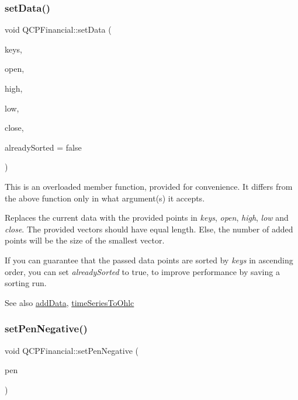 \subsubsection{\texorpdfstring{setData()}{setData()}\hspace{0.1cm}{\footnotesize\ttfamily [2/2]}}
{\footnotesize\ttfamily void Q\+C\+P\+Financial\+::set\+Data (\begin{DoxyParamCaption}\item[{const Q\+Vector$<$ double $>$ \&}]{keys,  }\item[{const Q\+Vector$<$ double $>$ \&}]{open,  }\item[{const Q\+Vector$<$ double $>$ \&}]{high,  }\item[{const Q\+Vector$<$ double $>$ \&}]{low,  }\item[{const Q\+Vector$<$ double $>$ \&}]{close,  }\item[{bool}]{already\+Sorted = {\ttfamily false} }\end{DoxyParamCaption})}

This is an overloaded member function, provided for convenience. It differs from the above function only in what argument(s) it accepts.

Replaces the current data with the provided points in {\itshape keys}, {\itshape open}, {\itshape high}, {\itshape low} and {\itshape close}. The provided vectors should have equal length. Else, the number of added points will be the size of the smallest vector.

If you can guarantee that the passed data points are sorted by {\itshape keys} in ascending order, you can set {\itshape already\+Sorted} to true, to improve performance by saving a sorting run.

\begin{DoxySeeAlso}{See also}
\mbox{\hyperlink{class_q_c_p_financial_a372ac031e44a7a6c912d203556af96f7}{add\+Data}}, \mbox{\hyperlink{class_q_c_p_financial_a9a058c035040d3939b8884f4aaccb1a7}{time\+Series\+To\+Ohlc}} 
\end{DoxySeeAlso}
\mbox{\label{class_q_c_p_financial_afe5c07e94ccea01a75b3a2476993c346}} 
\subsubsection{\texorpdfstring{setPenNegative()}{setPenNegative()}}
{\footnotesize\ttfamily void Q\+C\+P\+Financial\+::set\+Pen\+Negative (\begin{DoxyParamCaption}\item[{const Q\+Pen \&}]{pen }\end{DoxyParamCaption})}

